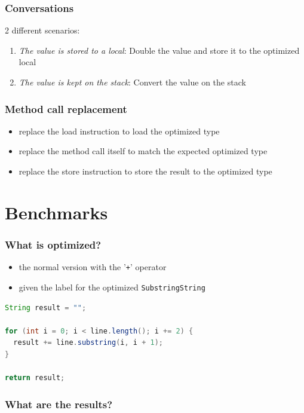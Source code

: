 \documentclass{beamer}
\begin{document}
\begin{frame}
  \frametitle{Conversations}  
  2 different scenarios:
  \begin{enumerate}
    \item \textit{The value is stored to a local}: Double the value and store it to the optimized local  
    \item \textit{The value is kept on the stack}: Convert the value on the stack
  \end{enumerate}
\end{frame}

\begin{frame}
  \frametitle{Method call replacement}  
  \begin{itemize}
    \item replace the load instruction to load the optimized type
    \item replace the method call itself to match the expected optimized type
    \item replace the store instruction to store the result to the optimized type
  \end{itemize}
\end{frame}

\section{Benchmarks}

\frame{\sectionpage}

\begin{frame}[fragile]
   \frametitle{What is optimized?}
   
   \begin{itemize}
      \item the normal version with the '\texttt{+}' operator
      \item given the label for the optimized \texttt{SubstringString}
   \end{itemize}

   \begin{lstlisting}[language=Java]
String result = "";

for (int i = 0; i < line.length(); i += 2) {
  result += line.substring(i, i + 1);
}

return result;
   \end{lstlisting}   

\end{frame}

\begin{frame}
  \frametitle{What are the results?}
  \begin{bchart}[step=2000,max=6000]
      \smallskip
  \end{bchart}
\end{frame}
\end{document}
